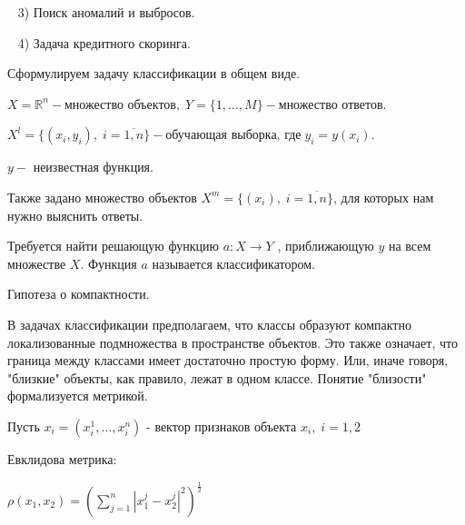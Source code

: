 \documentclass[a4paper,titlepage]{article}
\begin{document}
\par ~ 3) Поиск аномалий и выбросов. 

\par ~ 4) Задача кредитного скоринга.
\newpage




Сформулируем задачу классификации в общем виде.

$ X = \mathds{R}^n - \text{множество объектов}, \; Y = \{1, \ldots, M\} - \text{множество ответов}.$

$X^l = \{ (x_i, y_i), \; i = \overline{1, n} \} - \text{обучающая выборка, где} \; y_i = y(x_i).$

$y - $ неизвестная функция.

Также задано множество объектов $X^m = \{ (x_i), \; i = \overline{1, n} \}$, для которых нам нужно выяснить ответы.

Требуется найти решающую функцию $a: X \rightarrow Y $ , приближающую $y$ на всем множестве $X$. Функция $a$ называется классификатором.
\newpage




Гипотеза о компактности.

В задачах классификации предполагаем, что классы образуют компактно локализованные подмножества в пространстве объектов. Это также означает, что граница между классами имеет достаточно простую форму.
Или, иначе говоря, "близкие" \: объекты, как правило, лежат в одном классе. Понятие "близости" \: формализуется метрикой.

Пусть $x_i = (x_i^1, \ldots, x_i^n)$ - вектор признаков объекта $x_i, \; i =1,2$

Евклидова метрика:

\begin{center}
$\rho(x_1, x_2) = \left ( \sum \limits^n_{j = 1} {|x_1^j - x^j_2|}^2 \right ) ^{\frac{1}{2}}$
\end{center}
\end{document}
